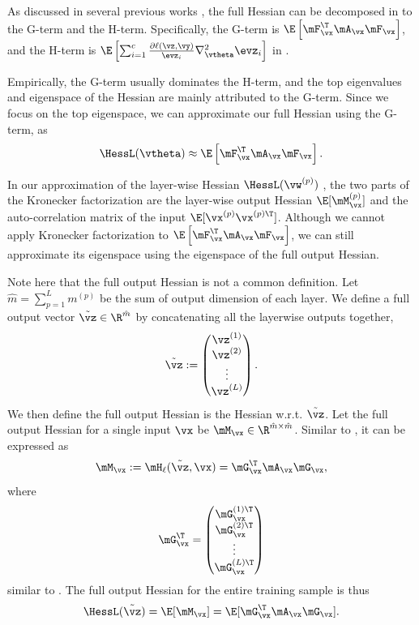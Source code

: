 As discussed in several previous works \citep{sagun2016eigenvalues, papyan2018full, papyan2019measurements, fort2019emergent}, the full Hessian can be decomposed in to the G-term and the H-term. Specifically, the G-term is $\E \left[\mF^\T_{\vx}\mA_\vx\mF_{\vx}\right]$, and the H-term is $\E\left[\sum_{i=1}^c \frac{\partial \ell(\vz,\vy)}{\evz_i} \nabla^2_\vtheta \evz_i \right]$ in .

Empirically, the G-term usually dominates the H-term, and the top eigenvalues and eigenspace of the Hessian are mainly attributed to the G-term. Since we focus on the top eigenspace, we can approximate our full Hessian using the G-term, as
\begin{equation}
     \HessL(\vtheta) \approx  \E\left[\mF^\T_{\vx}\mA_\vx\mF_{\vx}\right].
\end{equation}

In our approximation of the layer-wise Hessian $\HessL(\vw^{(p)})$ , the two parts of the Kronecker factorization are the layer-wise output Hessian $\E[\mM^{(p)}_\vx]$ and the auto-correlation matrix of the input $\E[\vx^{(p)}\vx^{(p)\T}]$. Although we cannot apply Kronecker factorization to $\E\left[\mF^\T_{\vx}\mA_\vx\mF_{\vx}\right]$, we can still approximate its eigenspace using the eigenspace of the full output Hessian.

Note here that the full output Hessian is not a common definition. Let $\hat{m} = \sum_{p=1}^Lm^{(p)}$ be the sum of output dimension of each layer. We define a full output vector $\tilde{\vz}\in\R^{\hat{m}}$ by concatenating all the layerwise outputs together,
\begin{equation}
    \tilde{\vz} := \begin{pmatrix}
    \vz^{(1)}\\
    \vz^{(2)}\\
    \vdots\\
    \vz^{(L)}
    \end{pmatrix}.
\end{equation} 
We then define the full output Hessian is the Hessian w.r.t. $\tilde{\vz}$. Let the full output Hessian for a single input $\vx$ be $\mM_\vx\in\R^{\hat{m}\times \hat{m}}$. Similar to , it can be expressed as
\begin{equation}
    \mM_\vx := \mH_\ell(\tilde{\vz}, \vx) = \mG_\vx^{\T}\mA_\vx\mG_\vx,
\end{equation}
where
\begin{equation}
    \mG^\T_\vx = \begin{pmatrix}
    \mG_\vx^{(1)\T}\\
    \mG_\vx^{(2)\T}\\
    \vdots\\
    \mG_\vx^{(L)\T}
    \end{pmatrix}
\end{equation}
similar to .
The full output Hessian for the entire training sample is thus
\begin{equation}
    \HessL(\tilde{\vz}) = \E[\mM_\vx] = \E[\mG_\vx^{\T}\mA_\vx\mG_\vx].
\end{equation}

